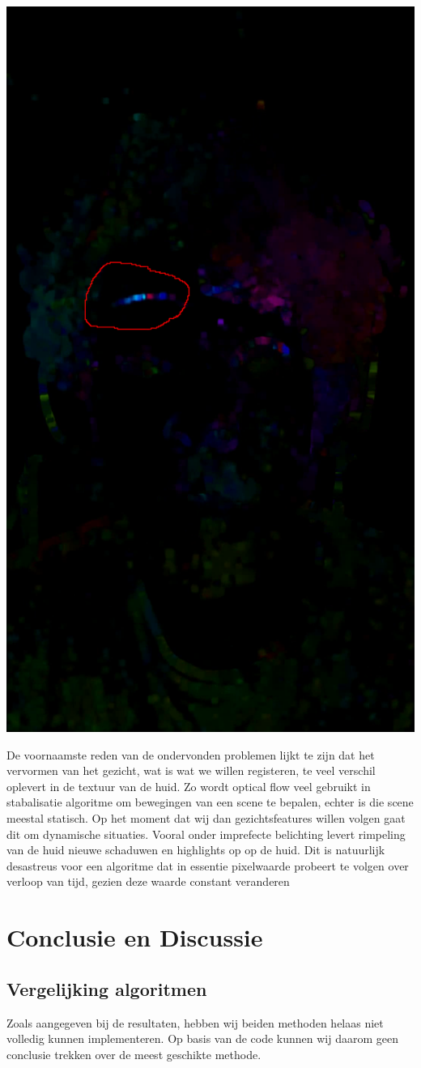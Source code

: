 \documentclass[11pt]{article}
\begin{document}
    \includegraphics[width=0.6\linewidth]{Images/opticalflow2.png}

    \newline
    De voornaamste reden van de ondervonden problemen lijkt te zijn dat het vervormen van het gezicht, wat is wat we willen registeren, te veel verschil oplevert in de textuur van de huid.
    Zo wordt optical flow veel gebruikt in stabalisatie algoritme om bewegingen van een scene te bepalen, echter is die scene meestal statisch. 
    Op het moment dat wij dan gezichtsfeatures willen volgen gaat dit om dynamische situaties.
    Vooral onder imprefecte belichting levert rimpeling van de huid nieuwe schaduwen en highlights op op de huid. 
    Dit is natuurlijk desastreus voor een algoritme dat in essentie pixelwaarde probeert te volgen over verloop van tijd, gezien deze waarde constant veranderen 


    \section{Conclusie en Discussie}\label{sec:conclusie-en-discussie}

    \subsection{Vergelijking algoritmen}
    Zoals aangegeven bij de resultaten, hebben wij beiden methoden helaas niet volledig kunnen implementeren.
    Op basis van de code kunnen wij daarom geen conclusie trekken over de meest geschikte methode.
\end{document}
